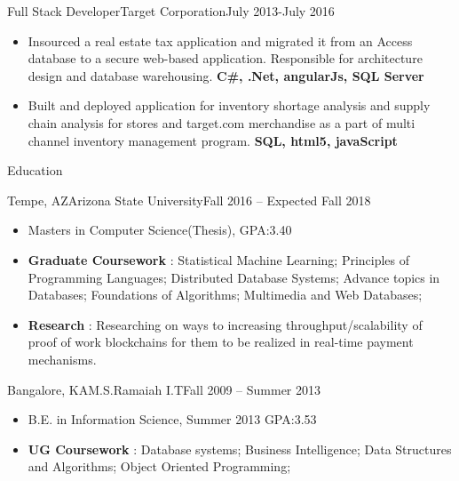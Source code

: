 \documentclass[]{nakulcv}
\begin{document}
    \begin{cvsubsection}{Full Stack Developer}{Target Corporation}{July 2013-July 2016}
        \begin{itemize}
            \item Insourced a real estate tax application and migrated it from an Access database to a secure web-based application. Responsible for architecture design and database warehousing.
                \textbf{ C\#, .Net, angularJs, SQL Server}
            \item Built and deployed application for inventory shortage analysis and
                supply chain analysis for stores and target.com merchandise as a part of multi channel inventory management program.\textbf{ SQL, html5, javaScript}
        \end{itemize}
    \end{cvsubsection}

    \begin{cvsection}{Education}
        \begin{cvsubsection}{Tempe, AZ}{Arizona State University}{Fall 2016 -- Expected Fall 2018}
            \begin{itemize}
                \item Masters in Computer Science(Thesis), GPA:3.40
                \item \textbf{Graduate Coursework} : Statistical Machine Learning; Principles of Programming Languages; Distributed Database Systems; Advance topics in Databases; Foundations of Algorithms; Multimedia and Web Databases;
                \item \textbf{Research} : Researching on ways to increasing throughput/scalability of
                    proof of work blockchains for them to be realized in real-time payment mechanisms. 
            \end{itemize}
        \end{cvsubsection}

        \begin{cvsubsection}{Bangalore, KA}{M.S.Ramaiah I.T}{Fall 2009 -- Summer 2013}
            \begin{itemize}
                \item B.E. in Information Science, Summer 2013 GPA:3.53
                \item \textbf{UG Coursework} : Database systems; Business Intelligence; Data Structures and Algorithms; Object Oriented Programming;
            \end{itemize}
        \end{cvsubsection}

    \end{cvsection}
\end{document}
